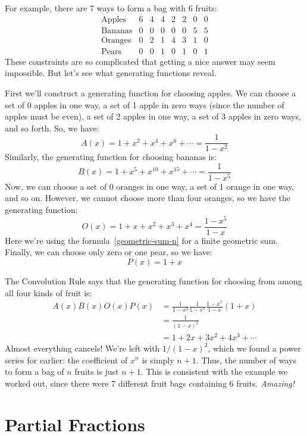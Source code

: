 For example, there are 7 ways to form a bag with 6 fruits:
%
\[
\begin{array}{c|ccccccc}
\text{Apples}  & 6 & 4 & 4 & 2 & 2 & 0 & 0 \\
\text{Bananas} & 0 & 0 & 0 & 0 & 0 & 5 & 5 \\
\text{Oranges} & 0 & 2 & 1 & 4 & 3 & 1 & 0 \\
\text{Pears}   & 0 & 0 & 1 & 0 & 1 & 0 & 1
\end{array}
\]
These constraints are so complicated that getting a nice answer may
seem impossible.  But let's see what generating functions reveal.

First we'll construct a generating function for choosing apples.  We
can choose a set of 0 apples in one way, a set of 1 apple in zero
ways (since the number of apples must be even), a set of 2 apples in
one way, a set of 3 apples in zero ways, and so forth.  So, we have:
%
\[
A(x) = 1 + x^2 + x^4 + x^6 + \cdots = \frac{1}{1 - x^2}
\]
%
Similarly, the generating function for choosing bananas is:
%
\[
B(x) = 1 + x^5 + x^{10} + x^{15} + \cdots = \frac{1}{1 - x^5}
\]
Now, we can choose a set of 0 oranges in one way, a set of 1 orange in
one way, and so on.  However, we cannot choose more than four
oranges, so we have the generating function:
%
\[
O(x) = 1 + x + x^2 + x^3 + x^4 = \frac{1-x^5}{1-x}
\]
Here we're using the formula~\eqref{geometric-sum-n} for a finite
geometric sum.  Finally, we can choose only zero or one pear, so we
have:
%
\[
P(x) = 1 + x
\]

The Convolution Rule says that the generating function for choosing
from among all four kinds of fruit is:
%
\begin{align*}
A(x) B(x) O(x) P(x)
    & = \frac{1}{1-x^2} \frac{1}{1-x^5} \frac{1-x^5}{1-x} (1 + x) \\
    & = \frac{1}{(1-x)^2} \\
    & = 1 + 2x + 3x^2 + 4 x^3 + \cdots
\end{align*}
%
Almost everything cancels!  We're left with $1 / (1-x)^2$, which we
found a power series for earlier: the coefficient of $x^n$ is simply
$n+1$.  Thus, the number of ways to form a bag of $n$ fruits is just
$n+1$.  This is consistent with the example we worked out, since there
were 7 different fruit bags containing 6 fruits.  \textit{Amazing!}

\section{Partial Fractions}\label{sec:partial-fraction}

